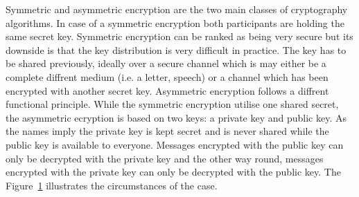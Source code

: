 Symmetric and asymmetric encryption are the two main classes of cryptography algorithms.
In case of a symmetric encryption both participants are holding the same secret key. 
Symmetric encryption can be ranked as being very secure but its downside is that the key distribution is very difficult in practice.
The key has to be shared previously, ideally over a secure channel which is may either be a complete diffrent medium (i.e. a letter, speech) or a channel which has been encrypted with another secret key.
Asymmetric encryption follows a diffrent functional principle. While the symmetric encryption utilise one shared secret, the asymmetric ecryption is based on two keys: a private key and public key. As the names imply the private key is kept secret and is never shared while the public key is available to everyone. Messages encrypted with the public key can only be decrypted with the private key and the other way round, messages encrypted with the private key can only be decrypted with the public key. The Figure~\ref{fig:asymmetric_encryption} illustrates the circumstances of the case.\\
\begin{figure}[htb]
	\centering%
	\\
	\label{fig:asymmetric_encryption}
\end{figure}


